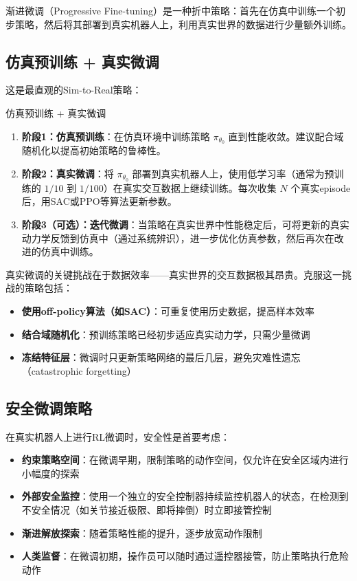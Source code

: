 渐进微调（Progressive Fine-tuning）是一种折中策略：首先在仿真中训练一个初步策略，然后将其部署到真实机器人上，利用真实世界的数据进行少量额外训练。

\subsection{仿真预训练 + 真实微调}

这是最直观的Sim-to-Real策略：

\begin{myalgorithm}{仿真预训练 + 真实微调}
\begin{enumerate}
    \item \textbf{阶段1：仿真预训练}：在仿真环境中训练策略 $\pi_{\theta_0}$ 直到性能收敛。建议配合域随机化以提高初始策略的鲁棒性。
    \item \textbf{阶段2：真实微调}：将 $\pi_{\theta_0}$ 部署到真实机器人上，使用低学习率（通常为预训练的 $1/10$ 到 $1/100$）在真实交互数据上继续训练。每次收集 $N$ 个真实episode后，用SAC或PPO等算法更新参数。
    \item \textbf{阶段3（可选）：迭代微调}：当策略在真实世界中性能稳定后，可将更新的真实动力学反馈到仿真中（通过系统辨识），进一步优化仿真参数，然后再次在改进的仿真中训练。
\end{enumerate}
\end{myalgorithm}

真实微调的关键挑战在于数据效率——真实世界的交互数据极其昂贵。克服这一挑战的策略包括：

\begin{itemize}
    \item \textbf{使用off-policy算法（如SAC）}：可重复使用历史数据，提高样本效率
    \item \textbf{结合域随机化}：预训练策略已经初步适应真实动力学，只需少量微调
    \item \textbf{冻结特征层}：微调时只更新策略网络的最后几层，避免灾难性遗忘（catastrophic forgetting）
\end{itemize}

\subsection{安全微调策略}

在真实机器人上进行RL微调时，安全性是首要考虑：

\begin{itemize}
    \item \textbf{约束策略空间}：在微调早期，限制策略的动作空间，仅允许在安全区域内进行小幅度的探索
    \item \textbf{外部安全监控}：使用一个独立的安全控制器持续监控机器人的状态，在检测到不安全情况（如关节接近极限、即将摔倒）时立即接管控制
    \item \textbf{渐进解放探索}：随着策略性能的提升，逐步放宽动作限制
    \item \textbf{人类监督}：在微调初期，操作员可以随时通过遥控器接管，防止策略执行危险动作
\end{itemize}

